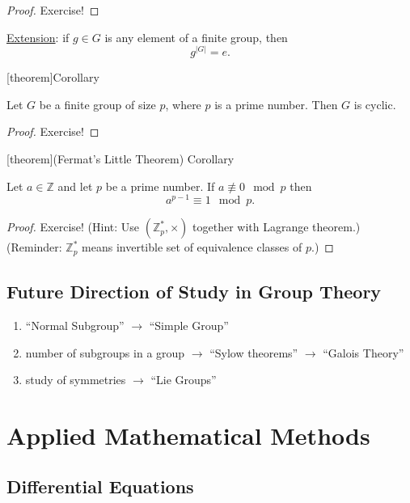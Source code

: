 \documentclass[12pt]{report}
\theoremstyle{definition}
\begin{document}
\begin{proof}
    Exercise!
\end{proof}

\underline{Extension}: if $g \in G$ is any element of a finite group, then\[
    g^{|G|} = e.
\]

[theorem]{Corollary}
\begin{cyclic G}
    Let $G$ be a finite group of size $p$, where $p$ is a prime number.
    Then $G$ is cyclic.
\end{cyclic G}

\begin{proof}
    Exercise!
\end{proof}

[theorem]{(Fermat's Little Theorem) Corollary}
\begin{Fermat's Little Theorem}
    Let $a \in \mathbb{Z}$ and let $p$ be a prime number.
    If $a \not\equiv 0 \mod p$ then\[
        a^{p - 1} \equiv 1 \mod p.
    \]
\end{Fermat's Little Theorem}

\begin{proof}
    Exercise! (Hint: Use $(\mathbb{Z}_p^{*}, \times)$ together with Lagrange theorem.)
    (Reminder: $\mathbb{Z}^{*}_p$ means invertible set of equivalence classes of $p$.)
\end{proof}

\section{Future Direction of Study in Group Theory}

\begin{enumerate}
    \item ``Normal Subgroup'' $\rightarrow$ ``Simple Group''
    \item number of subgroups in a group $\rightarrow$ ``Sylow theorems''
        $\rightarrow$ ``Galois Theory''
    \item study of symmetries $\rightarrow$ ``Lie Groups''
\end{enumerate}




\chapter{Applied Mathematical Methods}

\section{Differential Equations}
\end{document}
